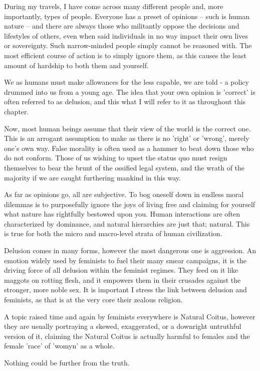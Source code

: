 During my travels, I have come across many different people and, more importantly, types of people.
Everyone has a preset of opinions -- such is human nature -- and there are always those who militantly
oppose the decisions and lifestyles of others, even when said individuals in no way impact their own
lives or sovereignty. Such narrow-minded people simply cannot be reasoned with. The most efficient
course of action is to simply ignore them, as this causes the least amount of hardship to both them
and yourself.

We as humans must make allowances for the less capable, we are told - a policy drummed into us from a young age.
The idea that your own opinion is 'correct' is often referred to as delusion, and this what I will refer to it
as throughout this chapter.

Now, most human beings assume that their view of the world is the correct one. This is an arrogant assumption
to make as there is no 'right' or 'wrong', merely one's own way. False morality is often used as a hammer to
beat down those who do not conform. Those of us wishing to upset the status quo must resign themselves to
bear the brunt of the ossified legal system, and the wrath of the majority if we are caught furthering mankind
in this way.

As far as opinions go, all are subjective. To bog oneself down in endless moral dilemmas is to purposefully
ignore the joys of living free and claiming for yourself what nature has rightfully bestowed upon you. Human
interactions are often characterized by dominance, and natural hierarchies are just that; natural. This is
true for both the micro and macro-level strata of human civilization.

Delusion comes in many forms, however the most dangerous one is aggression. An emotion widely used by
feminists to fuel their many smear campaigns, it is the driving force of all delusion within the feminist
regimes. They feed on it like maggots on rotting flesh, and it empowers them in their crusades against the
stronger, more noble sex. It is important I stress the link between delusion and feminists, as that is at
the very core their zealous religion.

A topic raised time and again by feminists everywhere is Natural Coitus, however they are usually portraying
a skewed, exaggerated, or a downright untruthful version of it, claiming the Natural Coitus is actually
harmful to females and the female 'race' of 'womyn' as a whole.

Nothing could be further from the truth.

